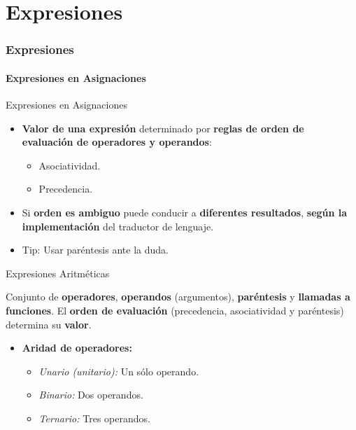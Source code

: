 \documentclass{beamer}
\begin{document}
\part{Expresiones}
\section{Expresiones}
\subsection{Expresiones en Asignaciones}

\begin{frame}[fragile]{Expresiones en Asignaciones}
\begin{itemize}
	\item \textbf{Valor de una expresión} determinado por \textbf{reglas de orden de evaluación de operadores y operandos}:
	\begin{itemize}
		\item Asociatividad.
		\item Precedencia.
	\end{itemize}
	\item Si \textbf{orden es ambiguo} puede conducir a \textbf{diferentes resultados}, \textbf{según la implementación} del traductor de lenguaje.
	\item Tip: Usar paréntesis ante la duda.
\end{itemize}
\end{frame}

\begin{frame}[fragile]{Expresiones Aritméticas}
\begin{block}{}
	Conjunto de \textbf{operadores}, \textbf{operandos} (argumentos), \textbf{paréntesis} y \textbf{llamadas a funciones}. El \textbf{orden de evaluación} (precedencia, asociatividad y paréntesis) determina su \textbf{valor}. 
\end{block}
\bigskip
\begin{itemize}
	\large
	\item \textbf{Aridad de operadores:}
	\begin{itemize}
		\large
		\item \emph{Unario (unitario):} Un sólo operando.
		\item \emph{Binario:}  Dos operandos.
		\item \emph{Ternario:} Tres operandos.
	\end{itemize}
\end{itemize}
\end{frame}
\end{document}
